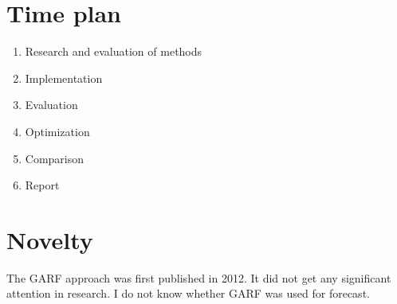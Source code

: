 \documentclass{scrartcl}
\begin{document}
\section{Time plan}

\begin{enumerate}
\item Research and evaluation of methods
\item Implementation
\item Evaluation
\item Optimization
\item Comparison
\item Report
\end{enumerate}

\section{Novelty}
The GARF approach was first published in 2012. It did not get any significant attention in research. I do not know whether GARF was used for forecast.






%







\end{document}
